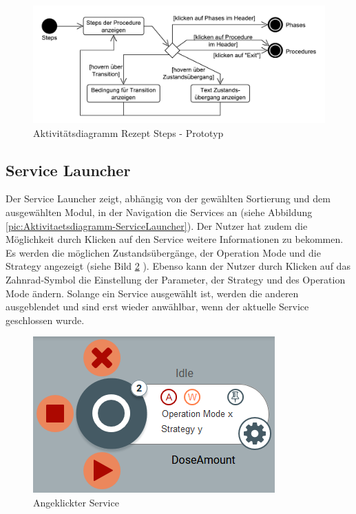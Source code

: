 \begin{figure}[htbp]
\centering
\includegraphics[scale=0.6]{DA_files/UML/Prototyp/Aktivitaetsdiagramm-Rezept-Steps.pdf}
\caption{Aktivitätsdiagramm Rezept Steps - Prototyp}
\label{pic:Aktivitaetsdiagramm-Rezept-Steps}
\end{figure}

\subsection{Service Launcher}
Der Service Launcher zeigt, abhängig von der gewählten Sortierung und dem ausgewählten Modul, in der Navigation die Services an (siehe Abbildung \ref{pic:Aktivitaetsdiagramm-ServiceLauncher}). Der Nutzer hat zudem die Möglichkeit durch Klicken auf den Service weitere Informationen zu bekommen. Es werden die möglichen Zustandsübergänge, der Operation Mode und die Strategy angezeigt (siehe Bild \ref{pic:Service-offen} ). Ebenso kann der Nutzer durch Klicken auf das Zahnrad-Symbol die Einstellung der Parameter, der Strategy und des Operation Mode ändern. Solange ein Service ausgewählt ist, werden die anderen ausgeblendet und sind erst wieder anwählbar, wenn der aktuelle Service geschlossen wurde.
\begin{figure}[htbp]
\centering
\includegraphics[scale=0.7]{DA_files/Bilder/Prototyp/Service-offen.png}
\caption{Angeklickter  Service}
\label{pic:Service-offen}
\end{figure}

